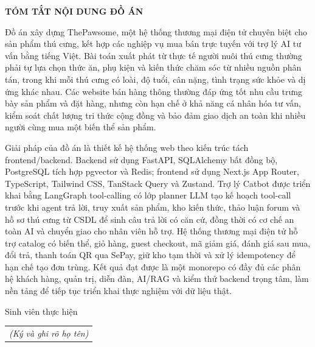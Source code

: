 \documentclass[../DoAn.tex]{subfiles}
\begin{document}
\begin{center}
    \Large{\textbf{TÓM TẮT NỘI DUNG ĐỒ ÁN}}\\
\end{center}
\vspace{1cm}
Đồ án xây dựng ThePawsome, một hệ thống thương mại điện tử chuyên biệt cho sản phẩm thú cưng, kết hợp các nghiệp vụ mua bán trực tuyến với trợ lý AI tư vấn bằng tiếng Việt. Bài toán xuất phát từ thực tế người nuôi thú cưng thường phải tự lựa chọn thức ăn, phụ kiện và kiến thức chăm sóc từ nhiều nguồn phân tán, trong khi mỗi thú cưng có loài, độ tuổi, cân nặng, tình trạng sức khỏe và dị ứng khác nhau. Các website bán hàng thông thường đáp ứng tốt nhu cầu trưng bày sản phẩm và đặt hàng, nhưng còn hạn chế ở khả năng cá nhân hóa tư vấn, kiểm soát chất lượng tri thức cộng đồng và bảo đảm giao dịch an toàn khi nhiều người cùng mua một biến thể sản phẩm.

Giải pháp của đồ án là thiết kế hệ thống web theo kiến trúc tách frontend/backend. Backend sử dụng FastAPI, SQLAlchemy bất đồng bộ, PostgreSQL tích hợp pgvector và Redis; frontend sử dụng Next.js App Router, TypeScript, Tailwind CSS, TanStack Query và Zustand. Trợ lý Catbot được triển khai bằng LangGraph tool-calling có lớp planner LLM tạo kế hoạch tool-call trước khi agent trả lời, truy xuất sản phẩm, kho kiến thức, thảo luận forum và hồ sơ thú cưng từ CSDL để sinh câu trả lời có căn cứ, đồng thời có cơ chế an toàn AI và chuyển giao cho nhân viên hỗ trợ. Hệ thống thương mại điện tử hỗ trợ catalog có biến thể, giỏ hàng, guest checkout, mã giảm giá, đánh giá sau mua, đổi trả, thanh toán QR qua SePay, giữ kho tạm thời và xử lý idempotency để hạn chế tạo đơn trùng. Kết quả đạt được là một monorepo có đầy đủ các phân hệ khách hàng, quản trị, diễn đàn, AI/RAG và kiểm thử backend trọng tâm, làm nền tảng để tiếp tục triển khai thực nghiệm với dữ liệu thật.
\begin{flushright}
Sinh viên thực hiện\\
\begin{tabular}{@{}c@{}}
\textit{(Ký và ghi rõ họ tên)}
\end{tabular}
\end{flushright}
\end{document}
